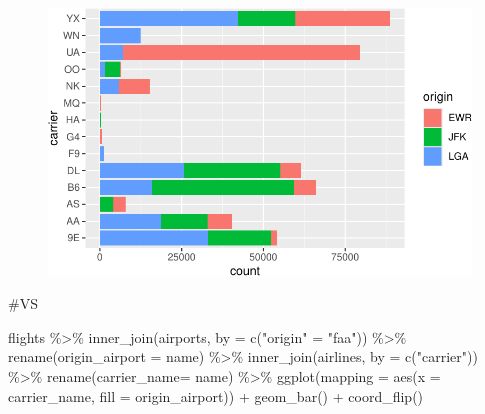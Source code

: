 \documentclass[
  letterpaper,
  DIV=11,
  numbers=noendperiod]{scrartcl}
\newenvironment{Shaded}{\begin{snugshade}}{\end{snugshade}}
\newcommand{\AttributeTok}[1]{\textcolor[rgb]{0.40,0.45,0.13}{#1}}
\newcommand{\CommentTok}[1]{\textcolor[rgb]{0.37,0.37,0.37}{#1}}
\newcommand{\FunctionTok}[1]{\textcolor[rgb]{0.28,0.35,0.67}{#1}}
\newcommand{\NormalTok}[1]{\textcolor[rgb]{0.00,0.23,0.31}{#1}}
\newcommand{\OtherTok}[1]{\textcolor[rgb]{0.00,0.23,0.31}{#1}}
\newcommand{\SpecialCharTok}[1]{\textcolor[rgb]{0.37,0.37,0.37}{#1}}
\newcommand{\StringTok}[1]{\textcolor[rgb]{0.13,0.47,0.30}{#1}}
\begin{document}
\begin{figure}[H]

{\centering \includegraphics{118_I_joining_files/figure-pdf/unnamed-chunk-9-1.pdf}

}

\end{figure}

\begin{Shaded}
\begin{Highlighting}[]
\CommentTok{\#VS}

\NormalTok{flights }\SpecialCharTok{\%\textgreater{}\%} 
  \FunctionTok{inner\_join}\NormalTok{(airports, }\AttributeTok{by =} \FunctionTok{c}\NormalTok{(}\StringTok{"origin"} \OtherTok{=} \StringTok{"faa"}\NormalTok{)) }\SpecialCharTok{\%\textgreater{}\%} 
  \FunctionTok{rename}\NormalTok{(}\AttributeTok{origin\_airport =}\NormalTok{ name) }\SpecialCharTok{\%\textgreater{}\%} 
  \FunctionTok{inner\_join}\NormalTok{(airlines, }\AttributeTok{by =} \FunctionTok{c}\NormalTok{(}\StringTok{"carrier"}\NormalTok{)) }\SpecialCharTok{\%\textgreater{}\%}  
  \FunctionTok{rename}\NormalTok{(}\AttributeTok{carrier\_name=}\NormalTok{ name) }\SpecialCharTok{\%\textgreater{}\%} 
\FunctionTok{ggplot}\NormalTok{(}\AttributeTok{mapping =} \FunctionTok{aes}\NormalTok{(}\AttributeTok{x =}\NormalTok{ carrier\_name, }\AttributeTok{fill =}\NormalTok{ origin\_airport)) }\SpecialCharTok{+}
  \FunctionTok{geom\_bar}\NormalTok{() }\SpecialCharTok{+} 
  \FunctionTok{coord\_flip}\NormalTok{()}
\end{Highlighting}
\end{Shaded}
\end{document}
